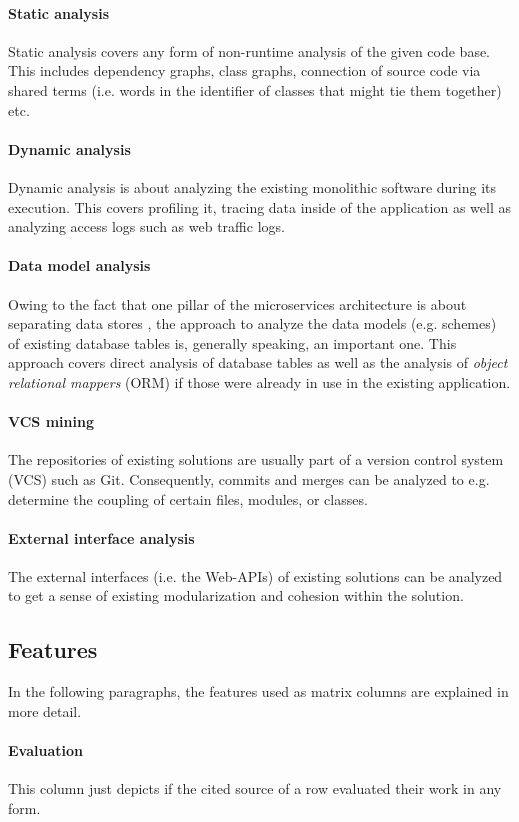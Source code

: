 \documentclass[12pt,a4paper]{report}
\begin{document}
\paragraph{Static analysis}
Static analysis covers any form of non-runtime analysis of the given code base.
This includes dependency graphs, class graphs, connection of source code via shared terms
(i.e. words in the identifier of classes that might tie them together) etc.
\paragraph{Dynamic analysis}
Dynamic analysis is about analyzing the existing monolithic software during its execution.
This covers profiling it, tracing data inside of the application as well as analyzing
access logs such as web traffic logs.
\paragraph{Data model analysis}
Owing to the fact that one pillar of the microservices architecture is about
separating data stores \cite{ms-microservices}, the approach to analyze
the data models (e.g. schemes) of existing database tables is, generally speaking,
an important one. This approach covers direct analysis of database tables
as well as the analysis of \textit{object relational mappers} (ORM)
if those were already in use in the existing application.
\paragraph{VCS mining}
The repositories of existing solutions are usually part of a
version control system (VCS) such as Git. Consequently, commits and merges can be analyzed
to e.g. determine the coupling of certain files, modules, or classes.
\paragraph{External interface analysis}
The external interfaces (i.e. the Web-APIs) of existing solutions can be analyzed to get
a sense of existing modularization and cohesion within the solution.


\subsection*{Features}

In the following paragraphs, the features used as matrix columns are explained in more detail.
\paragraph{Evaluation}
This column just depicts if the cited source of a row evaluated their work in any form.
\end{document}
